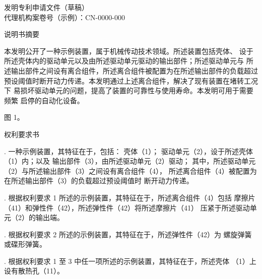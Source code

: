 \documentclass[12pt,a4paper,fontset=windows]{ctexart}
\title{\drafttitle}
\author{\draftapplicant}
\date{\today}
\newif\ifshowtoc
\newcommand{\npara}[1]{\par\noindent #1\par}
\newcommand{\parttitle}[1]{%
  \par\vspace{0.6em}%
  \begin{center}{\zihao{3}\heiti #1}\end{center}%
  \vspace{0.3em}\par}
\newcommand{\claim}[2]{\par\noindent #1. #2\par}
\newcommand{\mref}[1]{（#1）}
\newcommand{\draftdocket}{代理机构案卷号（示例）：CN-0000-000}
\begin{document}
\begin{center}
  {\heiti 发明专利申请文件（草稿）}\\[0.3em]
  {\small \draftdocket}
\end{center}
\vspace{0.5em}

\ifshowtoc
  \tableofcontents
  \newpage
\fi

\parttitle{说明书摘要}
\npara{本发明公开了一种示例装置，属于机械传动技术领域。所述装置包括壳体、
设于所述壳体内的驱动单元以及由所述驱动单元驱动的输出部件；所述驱动单元与
所述输出部件之间设有离合组件，所述离合组件被配置为在所述输出部件的负载超过
预设阈值时断开动力传递。本发明通过上述离合组件，解决了现有装置在堵转工况下
易损坏驱动单元的问题，提高了装置的可靠性与使用寿命。本发明可用于需要频繁
启停的自动化设备。}

\vspace{0.5em}
图 1。

\parttitle{权利要求书}

\claim{1}{一种示例装置，其特征在于，包括：
  壳体\mref{1}；
  驱动单元\mref{2}，设于所述壳体\mref{1}内；以及
  输出部件\mref{3}，由所述驱动单元\mref{2}驱动；
  其中，所述驱动单元\mref{2}与所述输出部件\mref{3}之间设有离合组件\mref{4}，
  所述离合组件\mref{4}被配置为在所述输出部件\mref{3}的负载超过预设阈值时
  断开动力传递。}

\claim{2}{根据权利要求 1 所述的示例装置，其特征在于，所述离合组件\mref{4}包括
  摩擦片\mref{41}和弹性件\mref{42}，所述弹性件\mref{42}将所述摩擦片\mref{41}
  压紧于所述驱动单元\mref{2}的输出端。}

\claim{3}{根据权利要求 2 所述的示例装置，其特征在于，所述弹性件\mref{42}为
  螺旋弹簧或碟形弹簧。}

\claim{4}{根据权利要求 1 至 3 中任一项所述的示例装置，其特征在于，所述壳体%
  \mref{1}上设有散热孔\mref{11}。}
\end{document}
